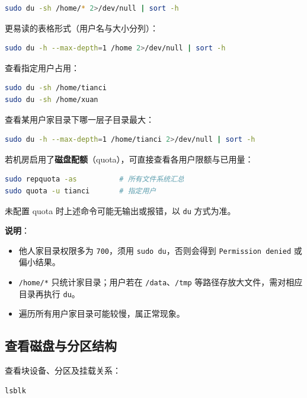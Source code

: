 \begin{lstlisting}[language=sh]
sudo du -sh /home/* 2>/dev/null | sort -h
\end{lstlisting}

更易读的表格形式（用户名与大小分列）：

\begin{lstlisting}[language=sh]
sudo du -h --max-depth=1 /home 2>/dev/null | sort -h
\end{lstlisting}

查看指定用户占用：

\begin{lstlisting}[language=sh]
sudo du -sh /home/tianci
sudo du -sh /home/xuan
\end{lstlisting}

查看某用户家目录下哪一层子目录最大：

\begin{lstlisting}[language=sh]
sudo du -h --max-depth=1 /home/tianci 2>/dev/null | sort -h
\end{lstlisting}

若机房启用了\textbf{磁盘配额}（quota），可直接查看各用户限额与已用量：

\begin{lstlisting}[language=sh]
sudo repquota -as          # 所有文件系统汇总
sudo quota -u tianci       # 指定用户
\end{lstlisting}

未配置 quota 时上述命令可能无输出或报错，以 \texttt{du} 方式为准。

\textbf{说明}：
\begin{itemize}
    \item 他人家目录权限多为 \texttt{700}，须用 \texttt{sudo du}，否则会得到 \texttt{Permission denied} 或偏小结果。
    \item \texttt{/home/*} 只统计家目录；用户若在 \texttt{/data}、\texttt{/tmp} 等路径存放大文件，需对相应目录再执行 \texttt{du}。
    \item 遍历所有用户家目录可能较慢，属正常现象。
\end{itemize}

\subsection{查看磁盘与分区结构}

查看块设备、分区及挂载关系：

\begin{lstlisting}[language=sh]
lsblk
\end{lstlisting}

